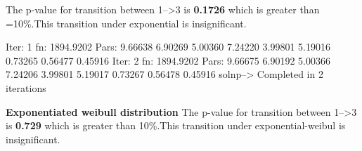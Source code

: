 \documentclass[11pt,a4paper]{article}
\begin{document}
The p-value for transition between 1-->3 is \textbf{0.1726} which is greater than  =10\%.This transition under exponential is insignificant. 
\begin{Schunk}
\begin{Soutput}
Iter: 1 fn: 1894.9202	 Pars:  9.66638 6.90269 5.00360 7.24220 3.99801 5.19016 0.73265 0.56477 0.45916
Iter: 2 fn: 1894.9202	 Pars:  9.66675 6.90192 5.00366 7.24206 3.99801 5.19017 0.73267 0.56478 0.45916
solnp--> Completed in 2 iterations
\end{Soutput}
\end{Schunk}

\textbf{Exponentiated weibull distribution}
The p-value for transition between 1-->3 is \textbf{0.729} which is greater than  10\%.This transition under exponential-weibul is insignificant.\\
\end{document}

